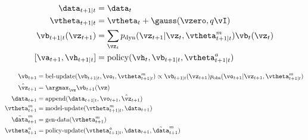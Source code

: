 \documentclass[fleqn,MITBook,openright]{fbook}
\newcommand{\pdyn}{p_{\text{dyn}}}
\newcommand{\pobs}{p_{\text{obs}}}
\begin{document}
\begin{align*}
  \data_{t+1|t} &= \data_t \\
  \vtheta_{t+1|t} &= \vtheta_t + \gauss(\vzero, q \vI) \\
  \vb_{t+1|t}(\vz_{t+1}) &= \sum_{\vz_t} \pdyn(\vz_{t+1} | \vz_t, \vtheta_{t+1|t}^m)
  \vb_t(\vz_t) \\
  [\va_{t+1}, \vh_{t+1|t}] &= \text{policy}(\vh_t, \vb_{t+1|t}, \vtheta_{t+1|t}^a) 
\end{align*}

\begin{align*}
  \vb_{t+1} &=
  \text{bel-update}(\vb_{t+1|t}, \vo_t, \vtheta_{t+1|t}^m) 
\propto \vb_{t+1|t}(\vz_{t+1}) \pobs(\vo_{t+1}|\vz_{t+1},\vtheta_{t+1|t}^m) \\
  \hat{\vz}_{t+1} &= \argmax_{\vz} \vb_{t+1}(\vz) \\
  \data_{t+1} &= \text{append}(\data_{t+1|t}, \vo_{t+1}, \hat{\vz}_{t+1}) \\
  \vtheta^m_{t+1} &= \text{model-update}(\vtheta^m_{t+1|t}, \data_{t+1})\\
  \tilde{\data}^m_{t+1} &= \text{gen-data}(\vtheta_{t+1}^m) \\
  \vtheta^a_{t+1} &= \text{policy-update}(\vtheta^a_{t+1|t}, \data_{t+1},
  \tilde{\data}^m_{t+1})
\end{align*}
\end{document}
